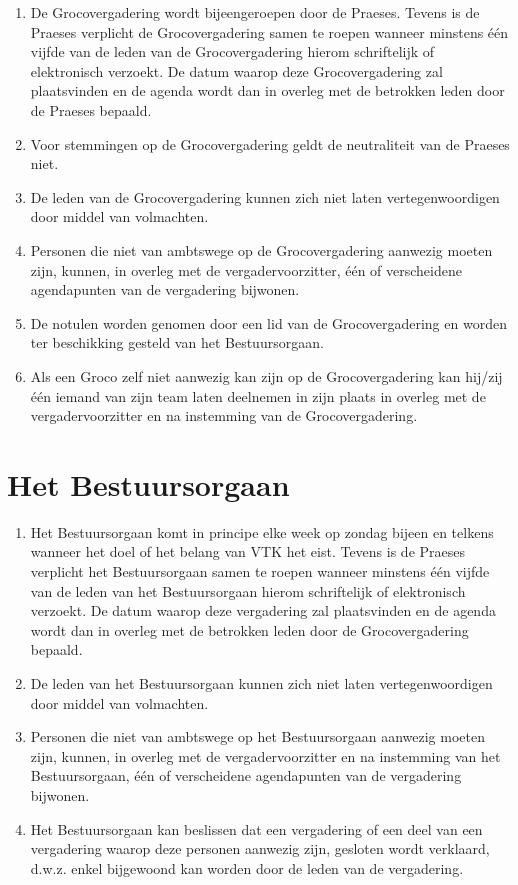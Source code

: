     \begin{enumerate}
    \item De Grocovergadering wordt bijeengeroepen door de Praeses. Tevens is de Praeses verplicht de Grocovergadering samen te roepen wanneer minstens \'e\'en vijfde van de leden van de Grocovergadering hierom schriftelijk of elektronisch verzoekt. De datum waarop deze Grocovergadering zal plaatsvinden en de agenda wordt dan in overleg met de betrokken leden door de Praeses bepaald.
    \item Voor stemmingen op de Grocovergadering geldt de neutraliteit van de Praeses niet. 
    \item De leden van de Grocovergadering kunnen zich niet laten vertegenwoordigen door middel van volmachten.
    \item Personen die niet van ambtswege op de Grocovergadering aanwezig moeten zijn, kunnen, in overleg met de vergadervoorzitter, \'e\'en of verscheidene agendapunten van de vergadering bijwonen.
    \item De notulen worden genomen door een lid van de Grocovergadering en worden ter beschikking gesteld van het Bestuursorgaan.
    \item Als een Groco zelf niet aanwezig kan zijn op de Grocovergadering kan hij/zij één  iemand van zijn team laten deelnemen in zijn plaats in overleg met de vergadervoorzitter en na instemming van de Grocovergadering.
    \end{enumerate}

\section{Het Bestuursorgaan}
    \begin{enumerate}
    \item Het Bestuursorgaan komt in principe elke week op zondag bijeen en telkens wanneer het doel of het belang van VTK het eist. Tevens is de Praeses verplicht het Bestuursorgaan samen te roepen wanneer minstens \'e\'en vijfde van de leden van het Bestuursorgaan hierom schriftelijk of elektronisch verzoekt. De datum waarop deze vergadering zal plaatsvinden en de agenda wordt dan in overleg met de betrokken leden door de Grocovergadering bepaald.
    \item De leden van het Bestuursorgaan kunnen zich niet laten vertegenwoordigen door middel van volmachten.
    \item Personen die niet van ambtswege op het Bestuursorgaan aanwezig moeten zijn, kunnen, in overleg met de vergadervoorzitter en na instemming van het Bestuursorgaan, \'e\'en of verscheidene agendapunten van de vergadering bijwonen.
    \item Het Bestuursorgaan kan beslissen dat een vergadering of een deel van een vergadering waarop deze personen aanwezig zijn, gesloten wordt verklaard, d.w.z. enkel bijgewoond kan worden door de leden van de vergadering.
    \end{enumerate}

